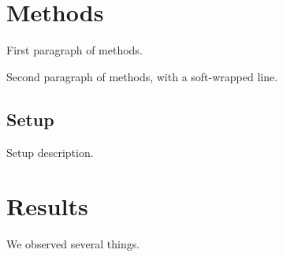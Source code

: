\section{Methods}

First paragraph of methods.

Second paragraph of methods,
with a soft-wrapped line.

\subsection{Setup}

Setup description.

\section{Results}

We observed several things.
